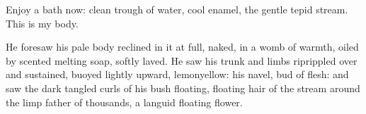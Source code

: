 Enjoy a bath now: clean trough of water, cool enamel, the gentle
tepid stream. This is my body.

He foresaw his pale body reclined in it at full, naked, in a womb of
warmth, oiled by scented melting soap, softly laved. He saw his trunk and
limbs riprippled over and sustained, buoyed lightly upward, lemonyellow:
his navel, bud of flesh: and saw the dark tangled curls of his bush
floating, floating hair of the stream around the limp father of thousands,
a languid floating flower.


